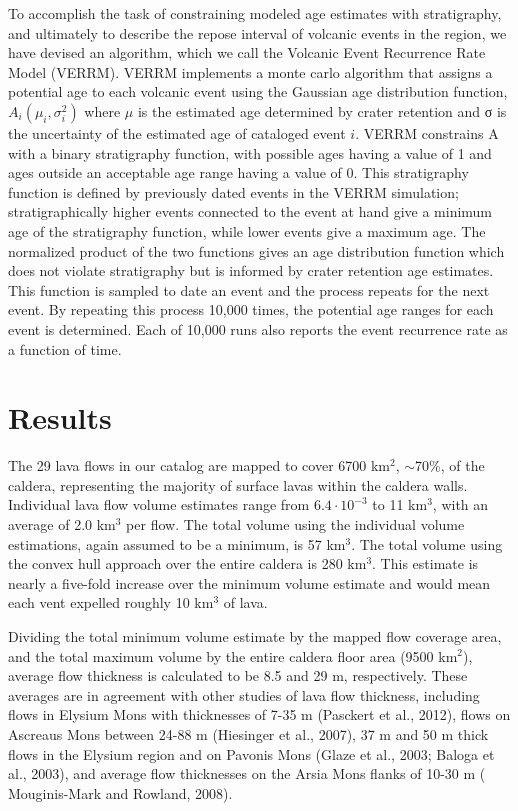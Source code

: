 \documentclass[12pt,letter]{article}
\begin{document}
To accomplish the task of constraining modeled age estimates with stratigraphy, and ultimately to describe the repose interval of volcanic events in the region, we have devised an algorithm, which we call the Volcanic Event Recurrence Rate Model (VERRM). VERRM implements a monte carlo algorithm that assigns a potential age to each volcanic event using the Gaussian age distribution function, $A_i(\mu_i,\sigma_i^2)$ where $\mu$ is the estimated age determined by crater retention and σ is the uncertainty of the estimated age of cataloged event $i$. VERRM constrains A with a binary stratigraphy function, with possible ages having a value of 1 and ages outside an acceptable age range having a value of 0. This stratigraphy function is defined by previously dated events in the VERRM simulation; stratigraphically higher events connected to the event at hand give a minimum age of the stratigraphy function, while lower events give a maximum age. The normalized product of the two functions gives an age distribution function which does not violate stratigraphy but is informed by crater retention age estimates. This function is sampled to date an event and the process repeats for the next event. By repeating this process 10,000 times, the potential age ranges for each event is determined. Each of 10,000 runs also reports the event recurrence rate as a function of time.

\section{Results}
The 29 lava flows in our catalog are mapped to cover 6700 km$^2$, $\sim$70\%, of the caldera, representing the majority of surface lavas within the caldera walls. Individual lava flow volume estimates range from $6.4\cdot 10^{-3}$ to 11 km$^3$, with an average of 2.0 km$^3$ per flow. The total volume using the individual volume estimations, again assumed to be a minimum, is 57 km$^3$. The total volume using the convex hull approach over the entire caldera is 280 km$^3$. This estimate is nearly a five-fold increase over the minimum volume estimate and would mean each vent expelled roughly 10 km$^3$ of lava. 

Dividing the total minimum volume estimate by the mapped flow coverage area, and the total maximum volume by the entire caldera floor area (9500 km$^2$), average flow thickness is calculated to be 8.5 and 29 m, respectively. These averages are in agreement with other studies of lava flow thickness, including flows  in Elysium Mons with thicknesses of 7-35 m (Pasckert et al., 2012), flows on Ascreaus Mons between 24-88 m (Hiesinger et al., 2007), 37 m and 50 m thick flows in the Elysium region and on Pavonis Mons (Glaze et al., 2003; Baloga et al., 2003), and average flow thicknesses on the Arsia Mons flanks of 10-30 m ( Mouginis-Mark and Rowland, 2008).
\end{document}
